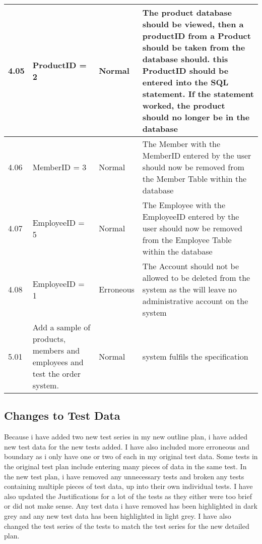 \begin{flushleft}
\begin{longtable}{|p{1.5cm}|p{2.5cm}|p{2cm}|p{4.5cm}|}
	4.05 & ProductID = 2 & Normal & The product database should be viewed, then a productID from a Product should be taken from the database should. this ProductID should be entered into the SQL statement. If the statement worked, the product should no longer be in the database\\ \hline
	4.06 & MemberID = 3 & Normal & The Member with the MemberID entered by the user should now be removed from the Member Table within the database \\ \hline
	4.07 & EmployeeID = 5 & Normal & The Employee with the EmployeeID entered by the user should now be removed from the Employee Table within the database \\ \hline
	4.08 &  EmployeeID = 1 & Erroneous & The Account should not be allowed to be deleted from the system as the will leave no administrative account on the system \\ \hline
	5.01 &  Add a sample of products, members and employees and test the order system.  & Normal &system fulfils the specification \\ \hline
    \end{longtable}
\end{flushleft}

\subsection{Changes to Test Data}
	
Because i have added two new test series in my new outline plan, i have added new test data for the new tests added. I have also included more erroneous and boundary as i only have one or two of each in my original test data. Some tests in the original test plan include entering many pieces of data in the same test. In the new test plan, i have removed any unnecessary tests and broken any tests containing multiple pieces of test data, up into their own individual tests. I have also updated the Justifications for a lot of the tests as they either were too brief or did not make sense. Any test data i have removed has been highlighted in dark grey and any new test data has been highlighted in light grey. I have also changed the test series of the tests to match the test series for the new detailed plan.

